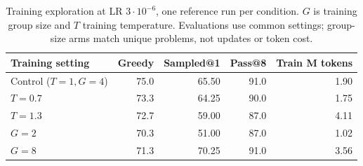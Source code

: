 \begin{table}[t]
\centering
\caption{Training exploration at LR $3\cdot 10^{-6}$, one reference run per condition. $G$ is training group size and $T$ training temperature. Evaluations use common settings; group-size arms match unique problems, not updates or token cost.}
\label{tab:exploration}
\footnotesize
\setlength{\tabcolsep}{4pt}
\begin{tabular}{lrrrr}
\toprule
Training setting & Greedy & Sampled@1 & Pass@8 & Train M tokens\\
\midrule
Control ($T=1,G=4$) & 75.0 & 65.50 & 91.0 & 1.90\\
$T=0.7$ & 73.3 & 64.25 & 90.0 & 1.75\\
$T=1.3$ & 72.7 & 59.00 & 87.0 & 4.11\\
$G=2$ & 70.3 & 51.00 & 87.0 & 1.02\\
$G=8$ & 71.3 & 70.25 & 91.0 & 3.56\\
\bottomrule
\end{tabular}
\end{table}
